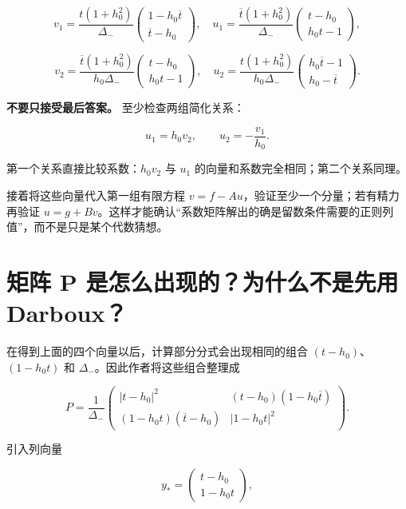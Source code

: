\[
v_1=\dfrac{t(1+h_0^2)}{\Delta_-}
\begin{pmatrix}1-h_0\overline t\\\overline t-h_0\end{pmatrix},
\quad
u_1=\dfrac{\overline t(1+h_0^2)}{\Delta_-}
\begin{pmatrix}t-h_0\\h_0t-1\end{pmatrix},
\]

\[
v_2=\dfrac{\overline t(1+h_0^2)}{h_0\Delta_-}
\begin{pmatrix}t-h_0\\h_0t-1\end{pmatrix},
\quad
u_2=\dfrac{t(1+h_0^2)}{h_0\Delta_-}
\begin{pmatrix}h_0\overline t-1\\h_0-\overline t\end{pmatrix}.
\]

\textbf{不要只接受最后答案。} 至少检查两组简化关系：\par

\[
u_1=h_0v_2,\qquad u_2=-\dfrac{v_1}{h_0}.
\]

第一个关系直接比较系数：$h_{0}v_{2}$ 与 $u_{1}$ 的向量和系数完全相同；第二个关系同理。\par

接着将这些向量代入第一组有限方程 $v=f-Au$，验证至少一个分量；若有精力再验证 $u=g+Bv$。这样才能确认“系数矩阵解出的确是留数条件需要的正则列值”，而不是只是某个代数猜想。\par

\section{矩阵 P 是怎么出现的？为什么不是先用 Darboux？}
\par

在得到上面的四个向量以后，计算部分分式会出现相同的组合 $(t-h_{0})$、$(1-h_{0}t)$ 和 $\Delta{}_{-}$。因此作者将这些组合整理成\par

\[
P=\dfrac{1}{\Delta_-}
\begin{pmatrix}
|t-h_0|^2&(t-h_0)(1-h_0\overline t)\\
(1-h_0t)(\overline t-h_0)&|1-h_0t|^2
\end{pmatrix}.
\]

引入列向量\par

\[
y_*=\begin{pmatrix}t-h_0\\1-h_0t\end{pmatrix},
\]

